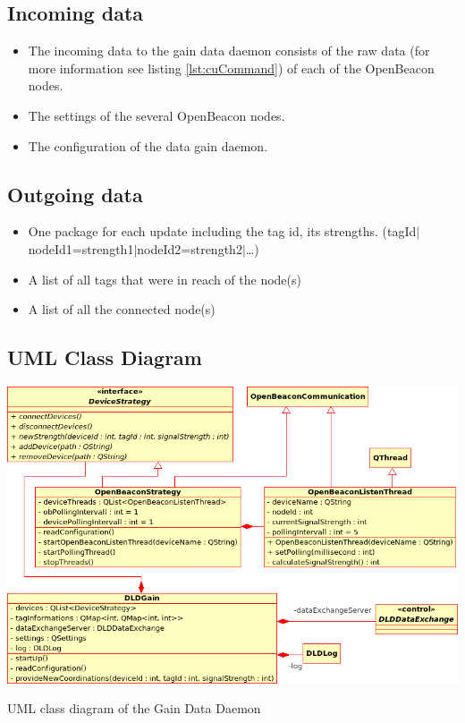    \subsection{Incoming data}
    \begin{itemize}
     \item The incoming data to the gain data daemon consists of the raw data (for more information see listing \ref{lst:cuCommand}) of each of the OpenBeacon nodes.
     \item The settings of the several OpenBeacon nodes.
     \item The configuration of the data gain daemon.
    \end{itemize}

   \subsection{Outgoing data}
    \begin{itemize}
     \item One package for each update including the tag id, its strengths. (tagId$|$ nodeId1=strength1$|$nodeId2=strength2$|$\dots)
     \item A list of all tags that were in reach of the node(s)
     \item A list of all the connected node(s)
    \end{itemize}

   \subsection{UML Class Diagram}
    \begin{staticFigure}
     \centering
     \includegraphics[scale=0.45]{UMLDiagrams/dldGain.png}
     \caption{UML class diagram of the Gain Data Daemon}
     \label{fg:projectModularization:gainDataDaemon}
    \end{staticFigure}

